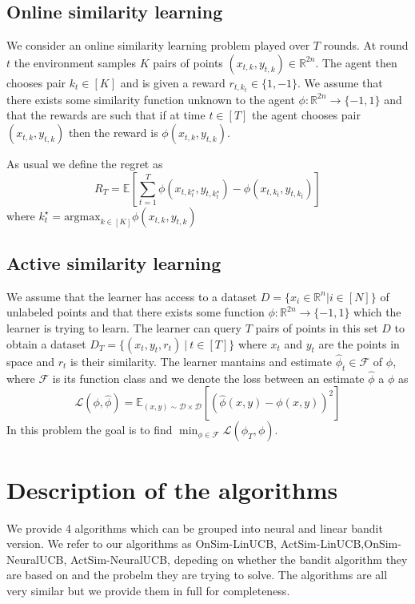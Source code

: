 \documentclass{article}
\begin{document}
\subsection{Online similarity learning}
\label{problem-statement:online-similarity-learning}
We consider an online similarity learning problem played over $T$ rounds.
At round $t$ the environment samples $K$ pairs of points $(x_{t,k}, y_{t,k}) \in \mathbb{R}^{2n}$.
The agent then chooses pair $k_t \in [K]$ and is given a reward $r_{t,k_{t}} \in \{1, -1\}$.
We assume that there exists some similarity function unknown to the agent $\phi: \mathbb{R}^{2n} \to \{-1, 1\}$
and that the rewards are such that if at time $t \in [T]$ the agent chooses pair $(x_{t,k}, y_{t,k})$
then the reward is $\phi(x_{t,k}, y_{t,k})$.

As usual we define the regret as
\[ R_T = \mathbb{E}\left[\sum_{t =1}^T \phi(x_{t,k^\star_t}, y_{t,k^\star_t}) - \phi(x_{t,k_t}, y_{t,k_t})\right]\]
where $k_t^\star = \text{argmax}_{k\in [K]} \phi(x_{t,k}, y_{t,k})$

\subsection{Active similarity learning}
\label{problem-statement:active-similarity-learning}
We assume that the learner has access to a dataset $D = \{x_i \in \mathbb{R}^n| i \in [N]\}$ of unlabeled points and that there exists some function $\phi: \mathbb{R}^{2n} \to \{-1, 1\}$ which the learner is trying to learn.
The learner can query $T$ pairs of points in this set $D$ to obtain a dataset $D_T = \{(x_t, y_t, r_t) ~|  ~t \in [T]\}$  where $x_t$ and $y_t$ are the points in space and $r_t$ is their similarity.
The learner mantains and estimate $\hat{\phi}_t \in \mathcal{F}$ of $\phi$, where $\mathcal{F}$ is its function class and we denote the loss between an estimate $\hat{\phi}$ a $\phi$ as
\[ \mathcal{L}(\phi, \hat{\phi}) = \mathbb{E}_{(x, y) \sim \mathcal{D} \times \mathcal{D}}[(\hat{\phi}(x,y) - \phi(x, y))^2] \]
In this problem the goal is to find $\min_{\phi \in \mathcal{F}} \mathcal{L}(\hat{\phi}_T, \phi)$.


\section{Description of the algorithms}
We provide 4 algorithms  which can be grouped into neural and linear bandit version. We refer to our algorithms as OnSim-LinUCB, ActSim-LinUCB,OnSim-NeuralUCB, ActSim-NeuralUCB, depeding on whether the bandit algorithm they are based on and the probelm
they are trying to solve. The algorithms are all very similar but we provide them in full for completeness.
\end{document}
